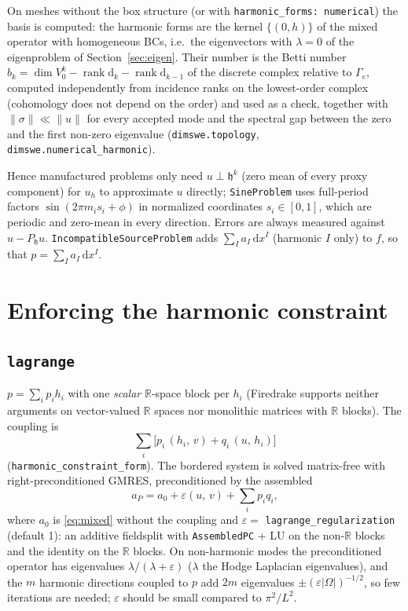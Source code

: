 \documentclass[11pt]{article}
\newcommand{\dd}{\mathrm{d}}
\newcommand{\Hspace}{\mathfrak{h}}
\newcommand{\R}{\mathbb{R}}
\newcommand{\code}[1]{\texttt{#1}}
\newcommand{\ip}[2]{\left(#1,\,#2\right)}
\theoremstyle{remark}
\begin{document}
On meshes without the box structure (or with \code{harmonic\_forms: numerical}) the basis is computed:
the harmonic forms are the kernel $\{(0,h)\}$ of the mixed operator with homogeneous BCs, i.e.\ the
eigenvectors with $\lambda=0$ of the eigenproblem of Section~\ref{sec:eigen}. Their number is the Betti
number $b_k=\dim V^k_0-\operatorname{rank}\dd_k-\operatorname{rank}\dd_{k-1}$ of the discrete complex
relative to $\Gamma_e$, computed independently from incidence ranks on the lowest-order complex (cohomology
does not depend on the order) and used as a check, together with $\|\sigma\|\ll\|u\|$ for every accepted
mode and the spectral gap between the zero and the first non-zero eigenvalue
(\code{dimswe.topology}, \code{dimswe.numerical\_harmonic}).

Hence manufactured problems only need $u\perp\Hspace^k$ (zero mean of every proxy component) for
$u_h$ to approximate $u$ directly; \code{SineProblem} uses full-period factors
$\sin(2\pi m_i s_i+\phi)$ in normalized coordinates $s_i\in[0,1]$, which are periodic and
zero-mean in every direction. Errors are always measured against $u-P_{\Hspace}u$.
\code{IncompatibleSourceProblem} adds $\sum_I a_I\,\dd x^I$ (harmonic $I$ only) to $f$, so that
$p=\sum_I a_I\,\dd x^I$.

\section{Enforcing the harmonic constraint}\label{sec:constraint}

\subsection{\code{lagrange}}

$p=\sum_i p_i h_i$ with one \emph{scalar} $\R$-space block per $h_i$ (Firedrake supports neither
arguments on vector-valued $\R$ spaces nor monolithic matrices with $\R$ blocks). The coupling is
\[
  \sum_i \bigl[p_i\,\ip{h_i}{v} + q_i\,\ip{u}{h_i}\bigr]
\]
(\code{harmonic\_constraint\_form}). The bordered system is solved matrix-free with
right-preconditioned GMRES, preconditioned by the assembled
\[
  a_P = a_0 + \varepsilon\ip{u}{v} + \sum_i p_i q_i ,
\]
where $a_0$ is \eqref{eq:mixed} without the coupling and $\varepsilon=$
\code{lagrange\_regularization} (default 1): an additive fieldsplit with \code{AssembledPC} + LU
on the non-$\R$ blocks and the identity on the $\R$ blocks. On non-harmonic modes the preconditioned
operator has eigenvalues $\lambda/(\lambda+\varepsilon)$ ($\lambda$ the Hodge Laplacian
eigenvalues), and the $m$ harmonic directions coupled to $p$ add $2m$ eigenvalues
$\pm(\varepsilon|\Omega|)^{-1/2}$, so few iterations are needed; $\varepsilon$ should be small
compared to $\pi^2/L^2$.
\end{document}

